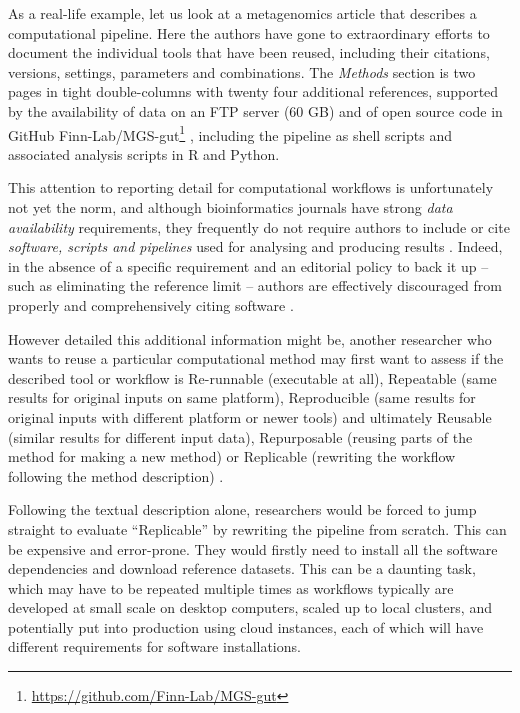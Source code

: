 As a real-life example, let us look at a metagenomics article
\cite{Almeida 2019} that describes
a computational pipeline. Here the authors have gone to extraordinary
efforts to document the individual tools that have been reused,
including their citations, versions, settings, parameters and
combinations. The \emph{Methods} section is two pages in tight
double-columns with twenty four additional references, supported by the
availability of data on an FTP server (60 GB)
\cite{EMBL-EBI 2019}
and of open source code in GitHub
Finn-Lab/MGS-gut\footnote{\url{https://github.com/Finn-Lab/MGS-gut}}
\cite{EMBL-EBI 2020}, including the
pipeline as shell scripts and associated analysis scripts in R and
Python.

This attention to reporting detail for computational workflows is
unfortunately not yet the norm, and although bioinformatics journals
have strong \emph{data availability} requirements, they frequently do
not require authors to include or cite \emph{software, scripts and
pipelines} used for analysing and producing results \cite{ch5-108}.
Indeed, in the absence of a specific requirement and an editorial policy
to back it up -- such as eliminating the reference limit -- authors are
effectively discouraged from properly and comprehensively citing
software \cite{ch5-53}.

However detailed this additional information might be, another
researcher who wants to reuse a particular computational method may
first want to assess if the described tool or workflow is Re-runnable
(executable at all), Repeatable (same results for original inputs on
same platform), Reproducible (same results for original inputs with
different platform or newer tools) and ultimately Reusable (similar
results for different input data), Repurposable (reusing parts of the
method for making a new method) or Replicable (rewriting the workflow
following the method description)
\cite{Benureau 2017,ch5-54}.

Following the textual description alone, researchers would be forced to
jump straight to evaluate ``Replicable'' by rewriting the pipeline from
scratch. This can be expensive and error-prone. They would firstly need
to install all the software dependencies and download reference
datasets. This can be a daunting task, which may have to be repeated
multiple times as workflows typically are developed at small scale on
desktop computers, scaled up to local clusters, and potentially put into
production using cloud instances, each of which will have different
requirements for software installations.


